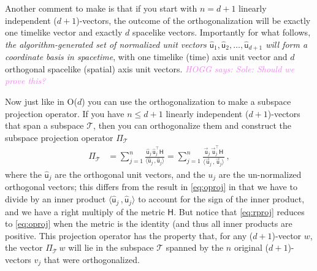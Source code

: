 \documentclass{article}
\newcommand{\metric}{\mathsf{H}}
\newcommand\upvec[1]{\!\vec{\,\mathrm{#1}}}
\newcommand{\Lvec}[1]{\upvec{\mathsf{#1}}} %
\newcommand{\Lhat}[1]{\hat{\mathsf{#1}}} %
\newcommand{\inner}[2]{\langle{#1}\,,{#2}\rangle}
\newcommand{\plus}{\!+\!} %
\newcommand{\HOGG}[1]{\textcolor{violet}{\textsl{HOGG says: {#1}}}}
\begin{document}
Another comment to make is that if you start with $n=d+1$ linearly independent ($d\plus1$)-vectors, the outcome of the orthogonalization will be exactly one timelike vector and exactly $d$ spacelike vectors.
Importantly for what follows, \emph{the algorithm-generated set of normalized unit vectors $\Lhat{u}_1,\Lhat{u}_2,\ldots,\Lhat{u}_{d+1}$ will form a coordinate basis in spacetime}, with one timelike (time) axis unit vector and $d$ orthogonal spacelike (spatial) axis unit vectors.
\HOGG{Sole: Should we prove this?}

Now just like in O($d$) you can use the orthogonalization to make a subspace projection operator.
If you have $n\leq d+1$ linearly independent ($d\plus1$)-vectors that span a subspace $\mathscr{T}$, then you can orthogonalize them and construct the subspace projection operator $\Pi_\mathscr{T}$
\begin{align}\label{eq:rproj}
    \Pi_\mathscr{T} &= \sum_{j=1}^n \frac{\Lhat{u}_j\,\Lhat{u}_j^\top\metric}{\inner{\Lhat{u}_j}{\Lhat{u}_j}} = \sum_{j=1}^n \frac{\Lvec{u}_j\,\Lvec{u}_j^\top\metric}{\inner{\Lvec{u}_j}{\Lvec{u}_j}} ~,
\end{align}
where the $\Lhat{u}_j$ are the orthogonal unit vectors, and the $u_j$ are the un-normalized orthogonal vectors; this differs from the result in \eqref{eq:oproj} in that we have to divide by an inner product $\inner{\Lhat{u}_j}{\Lhat{u}_j}$ to account for the sign of the inner product, and we have a right multiply of the metric $\metric$.
But notice that \eqref{eq:rproj} reduces to \eqref{eq:oproj} when the metric is the identity (and thus all inner products are positive.
This projection operator has the property that, for any ($d\plus1$)-vector $w$, the vector $\Pi_\mathscr{T}\,w$ will lie in the subspace $\mathscr{T}$ spanned by the $n$ original ($d\plus1$)-vectors $v_j$ that were orthogonalized.
\end{document}
